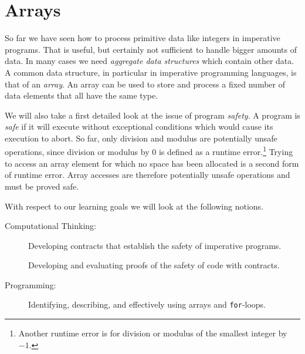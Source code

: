 \chapter{Arrays}
\label{ch:arrays}

\newcommand{\lecnum}{3}
\newcommand{\lecturer}{Frank Pfenning, Andr\'e Platzer}

\maketitle

\begin{preamble}
\noindent
So far we have seen how to process primitive data like integers in
imperative programs. That is useful, but certainly not sufficient to
handle bigger amounts of data.  In many cases we need \emph{aggregate
  data structures} which contain other data.  A common data structure,
in particular in imperative programming languages, is that of an
\emph{array}.  An array can be used to store and process a fixed
number of data elements that all have the same type.

We will also take a first detailed look at the issue of program
\emph{safety}.  A program is \emph{safe} if it will execute without
exceptional conditions which would cause its execution to abort.  So
far, only division and modulus are potentially unsafe operations,
since division or modulus by 0 is defined as a runtime
error.\footnote{Another runtime error is for division or modulus of
  the smallest integer by $-1$.} Trying to access an array element for
which no space has been allocated is a second form of runtime error.
Array accesses are therefore potentially unsafe operations and must be
proved safe.
\end{preamble}

\begin{gram}
With respect to our learning goals we will look at the following
notions.
\begin{description}
\item[Computational Thinking:] Developing contracts that establish the
  safety of imperative programs.

  Developing and evaluating proofs of the safety of
  code with contracts.

%

\item[Programming:]

  Identifying, describing, and effectively using arrays and
  \lstinline'for'-loops.

\end{description}


\end{gram}

